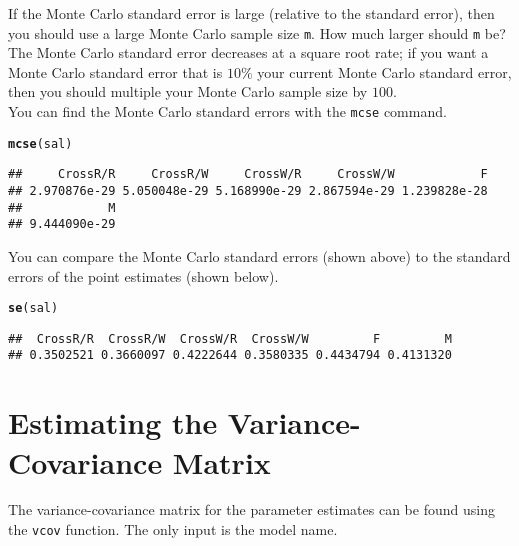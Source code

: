 \documentclass[11pt]{article}\usepackage[]{graphicx}\usepackage[]{color}
\makeatletter
\newcommand{\hlstd}[1]{\textcolor[rgb]{0.345,0.345,0.345}{#1}}%
\newcommand{\hlkwd}[1]{\textcolor[rgb]{0.737,0.353,0.396}{\textbf{#1}}}%
\newenvironment{kframe}{%
 \def\at@end@of@kframe{}%
 \ifinner\ifhmode%
  \def\at@end@of@kframe{\end{minipage}}%
  \begin{minipage}{\columnwidth}%
 \fi\fi%
 \def\FrameCommand##1{\hskip\@totalleftmargin \hskip-\fboxsep
 \colorbox{shadecolor}{##1}\hskip-\fboxsep
     \hskip-\linewidth \hskip-\@totalleftmargin \hskip\columnwidth}%
 \MakeFramed {\advance\hsize-\width
   \@totalleftmargin\z@ \linewidth\hsize
   \@setminipage}}%
 {\par\unskip\endMakeFramed%
 \at@end@of@kframe}
\newenvironment{knitrout}{}{} %
\makeatother
\begin{document}
If the Monte Carlo standard error is large (relative to the standard error), then you should use a large Monte Carlo sample size \texttt{m}. How much larger should \texttt{m} be? The Monte Carlo standard error decreases at a square root rate; if you want a Monte Carlo standard error that is $10\%$ your current Monte Carlo standard error, then you should multiple your Monte Carlo sample size by $100$.\\

You can find the Monte Carlo standard errors with the \texttt{mcse} command.
\begin{knitrout}
\color{fgcolor}\begin{kframe}
\begin{alltt}
\hlkwd{mcse}\hlstd{(sal)}
\end{alltt}
\begin{verbatim}
##     CrossR/R     CrossR/W     CrossW/R     CrossW/W            F 
## 2.970876e-29 5.050048e-29 5.168990e-29 2.867594e-29 1.239828e-28 
##            M 
## 9.444090e-29
\end{verbatim}
\end{kframe}
\end{knitrout}
You can compare the Monte Carlo standard errors (shown above) to the standard errors of the point estimates (shown below).
\begin{knitrout}
\color{fgcolor}\begin{kframe}
\begin{alltt}
\hlkwd{se}\hlstd{(sal)}
\end{alltt}
\begin{verbatim}
##  CrossR/R  CrossR/W  CrossW/R  CrossW/W         F         M 
## 0.3502521 0.3660097 0.4222644 0.3580335 0.4434794 0.4131320
\end{verbatim}
\end{kframe}
\end{knitrout}

\section{Estimating the Variance-Covariance Matrix}
The variance-covariance matrix for the parameter estimates can be found using the \texttt{vcov} function. The only input is the model name.\\
\end{document}
